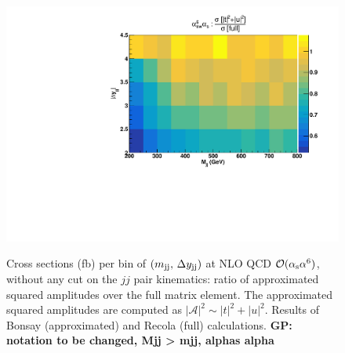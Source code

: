 \begin{figure}[h]
\centering
{\includegraphics[scale=0.39]{figures/scanfigures/a6as_vbfnloVSrecola_tu.pdf}}
\caption{Cross sections (fb) per bin of $(m_{\text{j}\text{j}},\,\Delta y_{\text{j}\text{j}})$ at NLO QCD $\mathcal{O}(\alpha_\text{s}\alpha^6)$, without any cut on the $jj$ pair kinematics: ratio of approximated squared amplitudes over the full matrix element. The approximated squared amplitudes are computed as $|\mathcal{A}|^2 \sim |t|^2 + |u|^2$. Results of {\sc Bonsay} (approximated) and {\sc Recola} (full) calculations. {\bf GP: notation to be changed, Mjj > mjj, alphas alpha} }\label{fig:ratio2d_NLO}
\end{figure}
